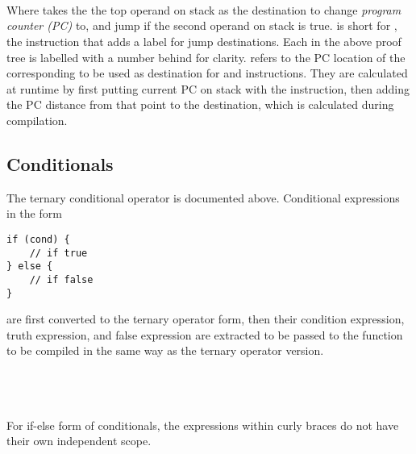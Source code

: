 \begin{prooftree}
\end{prooftree}\\\\\\
Where  takes the the top operand on stack as the destination to change \textit{program counter (PC)} to, and jump if the second operand on stack is true.  is short for , the instruction that adds a label for jump destinations. Each  in the above proof tree is labelled with a number behind for clarity.  refers to the PC location of the corresponding  to be used as destination for  and  instructions. They are calculated at runtime by first putting current PC on stack with the  instruction, then adding the PC distance from that point to the destination, which is calculated during compilation. 

\subsection{Conditionals}
The ternary conditional operator is documented above. Conditional expressions in the form 
\begin{verbatim}
if (cond) {
    // if true
} else {
    // if false
}
\end{verbatim}
are first converted to the ternary operator form, then their condition expression, truth expression, and false expression are extracted to be passed to the  function to be compiled in the same way as the ternary operator version. \\\\
\begin{prooftree}
\end{prooftree}\\\\
For if-else form of conditionals, the expressions within curly braces do not have their own independent scope. 

